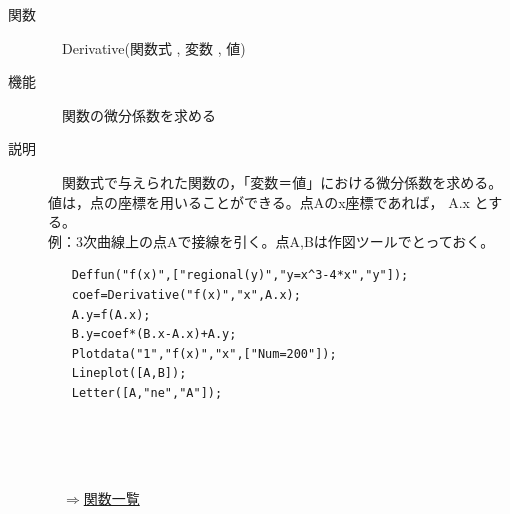 \documentclass[papersize,a4paper,12pt,uplatex]{jsarticle}
\begin{document}
\begin{description}

\hypertarget{derivative}{}
\item[関数]　Derivative(関数式 , 変数 , 値)
\item[機能]　関数の微分係数を求める
\item[説明]　関数式で与えられた関数の，「変数＝値」における微分係数を求める。\\
値は，点の座標を用いることができる。点Aのx座標であれば， A.x とする。\\

例：3次曲線上の点Aで接線を引く。点A,Bは作図ツールでとっておく。
\begin{verbatim}
　　Deffun("f(x)",["regional(y)","y=x^3-4*x","y"]);
　　coef=Derivative("f(x)","x",A.x);
　　A.y=f(A.x);
　　B.y=coef*(B.x-A.x)+A.y;
　　Plotdata("1","f(x)","x",["Num=200"]);
　　Lineplot([A,B]);
　　Letter([A,"ne","A"]);
\end{verbatim}
　\\
　　\\
　\\
\begin{flushright}　\hyperlink{functionlist}{$\Rightarrow$関数一覧}\end{flushright}


\end{description}
\end{document}
